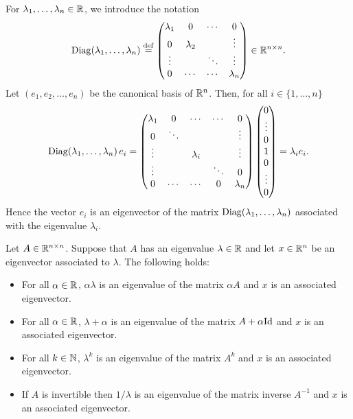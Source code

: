 \documentclass[11pt,nocut]{article}
\begin{document}
\begin{example}
For $\lambda_1, \dots, \lambda_n \in \mathbb{R}$, we introduce the notation
$$
{{\rm Diag}}(\lambda_1, \dots, \lambda_n) \overset{\rm def}{=}
\begin{pmatrix}
	\lambda_1 & 0 & \cdots & 0 \\
	0 & \lambda_2 & & \vdots \\
	\vdots & & \ddots & \vdots \\
	0 & \cdots &  \cdots & \lambda_n
\end{pmatrix} \in \mathbb{R}^{n\times n}.
$$
Let $(e_1, e_2, \dots, e_n)$ be the canonical basis of $\mathbb{R}^n$. Then, for all $i \in \{1, \dots, n\}$ 
$$
{{\rm Diag}}(\lambda_1, \dots, \lambda_n) \, e_i = 
\begin{pmatrix}
	\lambda_1 & 0 & \cdots& \cdots & 0 \\
	0 & \ddots & & & \vdots \\
	\vdots & & \lambda_i & & \vdots \\
	\vdots & & & \ddots & 0 \\
	0 & \cdots &  \cdots & 0 & \lambda_n
\end{pmatrix} 
\begin{pmatrix}
	0 \\
	 \vdots \\
	0 \\
	1 \\
	0 \\
	 \vdots \\
	0
\end{pmatrix} 
= \lambda_i e_i.
$$
Hence the vector $e_i$ is an eigenvector of the matrix ${{\rm Diag}}(\lambda_1, \dots, \lambda_n)$
associated with the eigenvalue $\lambda_i$.
\end{example}

\begin{proposition}
	Let $A \in \mathbb{R}^{n \times n}$. 
	Suppose that $A$ has an eigenvalue $\lambda \in \mathbb{R}$ and let $x \in \mathbb{R}^n$ be an eigenvector associated to $\lambda$.
	The following holds:
	\begin{itemize}
		\item For all $\alpha \in \mathbb{R}$, $\alpha \lambda$ is an eigenvalue of the matrix $\alpha A$ and $x$ is an associated eigenvector.
		\item For all $\alpha \in \mathbb{R}$, $\lambda + \alpha$ is an eigenvalue of the matrix $A + \alpha {{\rm Id}}$ and $x$ is an associated eigenvector.
		\item For all $k \in \mathbb{N}$, $\lambda^k$ is an eigenvalue of the matrix $A^k$ and $x$ is an associated eigenvector.
		\item If $A$ is invertible then $1/\lambda$ is an eigenvalue of the matrix inverse $A^{-1}$ and $x$ is an associated eigenvector.
	\end{itemize}
\end{proposition}
\end{document}
